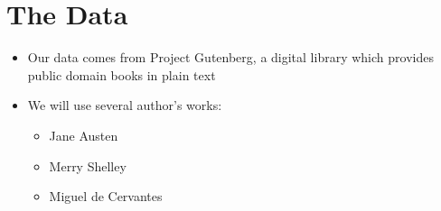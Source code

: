 \documentclass[t]{beamer}\usepackage[]{graphicx}\usepackage[]{color}
\begin{document}
\section{The Data}

\begin{frame}
\begin{itemize}
  \item Our data comes from Project Gutenberg, a digital library which provides public domain books in plain text
  \item We will use several author's works:
  \begin{itemize}
    \item Jane Austen
    \item Merry Shelley
    \item Miguel de Cervantes
  \end{itemize}
\end{itemize}
\end{frame}
\end{document}

